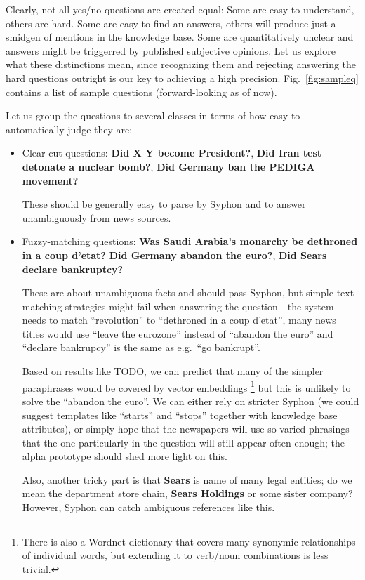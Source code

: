 \documentclass[11pt,a4paper]{article}
\begin{document}
Clearly, not all yes/no questions are created equal:
Some are easy to understand, others are hard.
Some are easy to find an answers, others will produce just a smidgen of mentions in the knowledge base.
Some are quantitatively unclear and answers might be triggerred by published subjective opinions.
Let us explore what these distinctions mean,
since recognizing them and rejecting answering
the hard questions outright is our key to achieving a high precision.
Fig.~\ref{fig:sampleq} contains a list of sample questions (forward-looking as of now).

Let us group the questions to several classes in terms of how easy to automatically judge they are:

\begin{itemize}
	\item Clear-cut questions: \textbf{Did X Y become President?},
		\textbf{Did Iran test detonate a nuclear bomb?},
		\textbf{Did Germany ban the PEDIGA movement?}

		These should be generally easy to parse by Syphon
		and to answer unambiguously from news sources.

	\item Fuzzy-matching questions: \textbf{Was Saudi Arabia’s monarchy be dethroned in a coup d’etat?}
		\textbf{Did Germany abandon the euro?},
		\textbf{Did Sears declare bankruptcy?}

		These are about unambiguous facts and should pass Syphon,
		but simple text matching strategies might fail when
		answering the question - the system needs to match
		``revolution'' to ``dethroned in a coup d'etat'',
		many news titles would use ``leave the eurozone''
		instead of ``abandon the euro'' and ``declare bankrupcy''
		is the same as e.g.\ ``go bankrupt''.

		Based on results like TODO,
		we can predict that many of the simpler paraphrases
		would be covered by vector embeddings%
\footnote{There is also a Wordnet dictionary that covers many synonymic relationships of individual words, but extending it to verb/noun combinations is less trivial.}
		but this is unlikely to solve the ``abandon the euro''.
		We can either rely on stricter Syphon
		(we could suggest templates like ``starts'' and ``stops''
		together with knowledge base attributes),
		or simply hope that the newspapers will use so varied
		phrasings that the one particularly in the question
		will still appear often enough; the alpha prototype
		should shed more light on this.

		Also, another tricky part is that \textbf{Sears} is name
		of many legal entities; do we mean the department store
		chain, \textbf{Sears Holdings} or some sister company?
		However, Syphon can catch ambiguous references like this.


\end{itemize}
\end{document}
